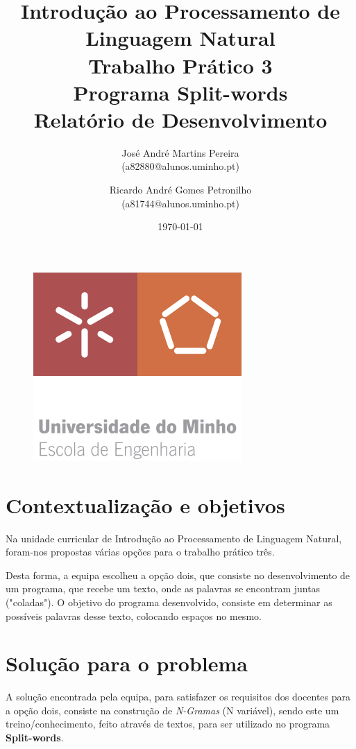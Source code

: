 \documentclass[11pt,a4paper]{report}%
\title{Introdução ao Processamento de Linguagem Natural\\
        Trabalho Prático 3\\
       \textbf{Programa Split-words}\\ Relatório de Desenvolvimento
       } %
\author{José André Martins Pereira\\ (a82880@alunos.uminho.pt) \and Ricardo André Gomes Petronilho\\ (a81744@alunos.uminho.pt)
       } %
\date{\today} %
\begin{document}

\begin{figure}
    \centering
    \includegraphics[scale=0.50]{images/uminho-logo.png}
\end{figure}

\maketitle %


\section{Contextualização e objetivos}
\hspace{5mm} Na unidade curricular de Introdução ao Processamento de Linguagem Natural, foram-nos propostas várias opções para o trabalho prático três.

\hspace{5mm} Desta forma, a equipa escolheu a opção dois, que consiste no desenvolvimento de um programa, que recebe um texto, onde as palavras se encontram juntas ("coladas"). O objetivo do programa desenvolvido, consiste em determinar as possíveis palavras desse texto, colocando espaços no mesmo.

\section{Solução para o problema}
\hspace{5mm} A solução encontrada pela equipa, para satisfazer os requisitos dos docentes para a opção dois, consiste na construção de \textit{N-Gramas} (N variável), sendo este um treino/conhecimento, feito através de textos, para ser utilizado no programa \textbf{Split-words}. 
\end{document}
